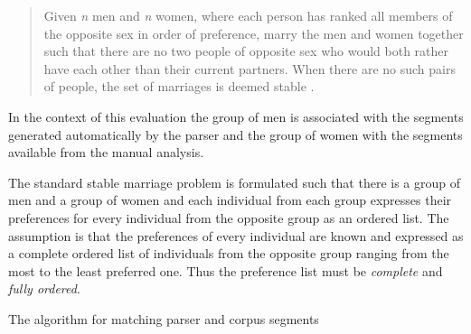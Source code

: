     \begin{quotation}
        Given \textit{n} men and \textit{n} women, where each person has ranked all members of the opposite sex in order of preference, marry the men and women together such that there are no two people of opposite sex who would both rather have each other than their current partners. When there are no such pairs of people, the set of marriages is deemed stable \citep{iwama2008}.
    \end{quotation}

    In the context of this evaluation the group of men is associated with the segments generated automatically by the parser and the group of women with the segments available from the manual analysis. 

    The standard stable marriage problem is formulated such that there is a group of men and a group of women and each individual from each group expresses their preferences for every individual from the opposite group as an ordered list. The assumption is that the preferences of every individual are known and expressed as a complete ordered list of individuals from the opposite group ranging from the most to the least preferred one. Thus the preference list must be \textit{complete} and \textit{fully ordered}. 

    \begin{algorithm}[!ht]\small
        \Input{\aslist, \mslist} %
        \caption{The algorithm for matching parser and corpus segments}
        \label{alg:matching}
    \end{algorithm}

